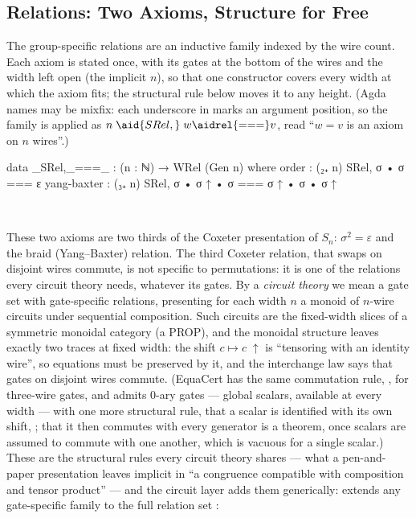 \subsection{Relations: Two Axioms, Structure for Free}\label{app:sn-relations}

The group-specific relations are an inductive family indexed by the wire
count.  Each axiom is stated once, with its gates at the bottom of the
wires and the width left open (the implicit $n$), so that one constructor
covers every width at which the axiom fits; the structural rule
 below moves it to any height.  (Agda names may be mixfix:
each underscore in  marks an argument
position, so the family is applied as $n\;\aid{SRel,}\;w \aidrel{===}
v$, read ``$w = v$ is an axiom on $n$ wires''.)

\begin{center}
\begin{minipage}[c]{0.58\linewidth}
\begingroup\setlength{\mathindent}{0pt}
\begin{code}
data _SRel,_===_ : (n : ℕ) → WRel (Gen n) where
  order       : (₂₊ n) SRel, σ • σ === ε
  yang-baxter : (₃₊ n) SRel, σ • σ ↑ • σ === σ ↑ • σ • σ ↑
\end{code}
\endgroup
\end{minipage}\hspace{2.5em}%
\begin{minipage}[c]{0.28\linewidth}\centering
  \\[4pt]
\end{minipage}
\end{center}

\noindent These two axioms are two thirds of the Coxeter presentation of
$S_n$: $\sigma^2 = \varepsilon$ and the braid (Yang--Baxter) relation.
The third Coxeter relation, that swaps on disjoint wires commute, is not
specific to permutations: it is one of the relations every circuit
theory needs, whatever its gates.  By a
\emph{circuit theory} we mean a gate set with gate-specific relations,
presenting for each width $n$ a monoid of $n$-wire circuits under
sequential composition.  Such circuits are the fixed-width slices of a
symmetric monoidal category (a PROP), and the monoidal structure leaves
exactly two traces at fixed width: the shift $c \mapsto c\;{\uparrow}$ is
``tensoring with an identity wire'', so equations must be preserved by
it, and the interchange law says that gates on disjoint wires commute.
(EquaCert has the same commutation rule, , for three-wire
gates, and admits $0$-ary gates --- global scalars, available at
every width --- with one more structural rule, that a scalar is
identified with its own shift, ; that it then commutes with
every generator is a theorem, once scalars are assumed to commute with
one another, which is vacuous for a single scalar.)  These are the structural rules every
circuit theory shares --- what a
pen-and-paper presentation leaves implicit in ``a congruence compatible
with composition and tensor product'' --- and the circuit layer adds them
generically:  extends any
gate-specific family to the full relation set :

